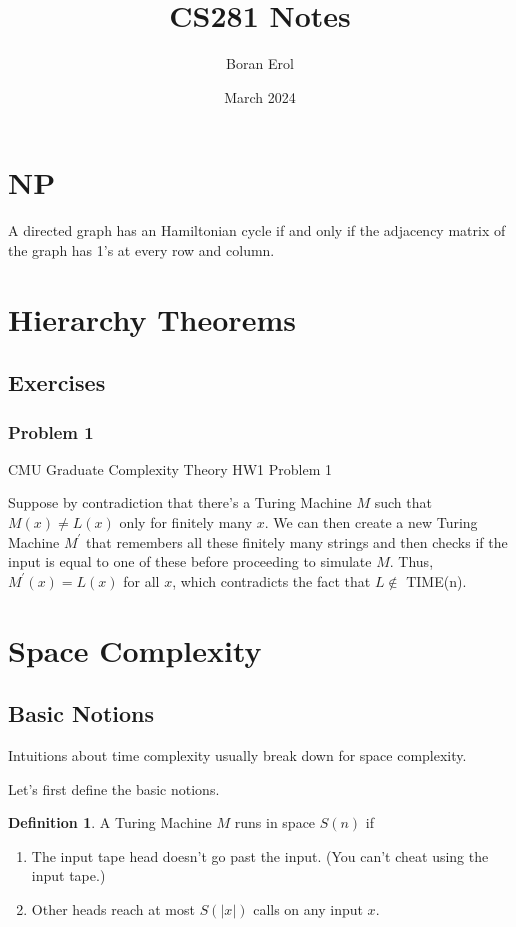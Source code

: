 \documentclass{article}
\title{CS281 Notes}
\date{March 2024}
\author{Boran Erol}
\theoremstyle{definition}
\newtheorem{definition}{Definition}
\begin{document}
\maketitle

\section{NP}

A directed graph has an Hamiltonian cycle if and only if
the adjacency matrix of the graph has 1's at every 
row and column.

\newpage

\section{Hierarchy Theorems}

\subsection{Exercises}

\subsubsection{Problem 1}

CMU Graduate Complexity Theory HW1 Problem 1

Suppose by contradiction that there's a Turing Machine $M$ such that $M(x) \neq L(x)$ only for finitely many $x$. We can then create a new Turing Machine $M^{\prime}$ that remembers all these finitely many strings and then checks if the input is equal to one of these before proceeding to simulate $M$. Thus, $M^{\prime}(x) = L(x)$ for all $x$, which contradicts the fact that $L \notin$ TIME(n).

\newpage

\section{Space Complexity}

\subsection{Basic Notions}

Intuitions about time complexity usually break down for space complexity.

Let's first define the basic notions.

\begin{definition}
    A Turing Machine $M$ runs in space $S(n)$ if
    \begin{enumerate}
        \item The input tape head doesn't go past the input. (You can't cheat using the input tape.)
        \item Other heads reach at most $S (\lvert x \rvert)$ calls on any input $x$.
    \end{enumerate}
\end{definition}
\end{document}
